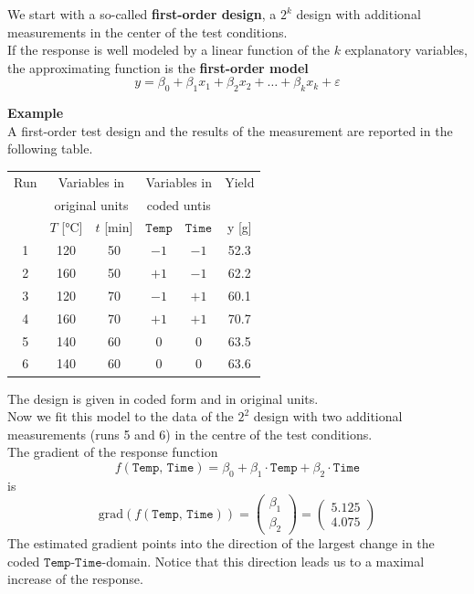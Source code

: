 We start with a so-called \textbf{first-order design}, a $2^k$ design with additional measurements in the center of the test conditions.\\
If the response is well modeled by a linear function of the $k$ explanatory variables, the approximating function is the \textbf{first-order model}
\begin{equation}
  y = \beta_0 + \beta_1 x_1 + \beta_2 x_2 + \dots + \beta_k x_k + \varepsilon
\end{equation}

\textbf{Example}\\
A first-order test design and the results of the measurement are reported in the following table.
\begin{table}[H]
  \centering
  \scriptsize
    \begin{tabular}{c|cc|cc|c}
      Run & \multicolumn{2}{c}{Variables in}   & \multicolumn{2}{c}{Variables in} & Yield \\
          & \multicolumn{2}{c}{original units} & \multicolumn{2}{c}{coded untis}  &       \\
          & $T$ [°C] & $t$ [min]               & $\texttt{Temp}$ & $\texttt{Time}$ & y [g]\\ \hline
      1 & 120 & 50 & $-1$ & $-1$ & 52.3 \\
      2 & 160 & 50 & $+1$ & $-1$ & 62.2 \\
      3 & 120 & 70 & $-1$ & $+1$ & 60.1 \\
      4 & 160 & 70 & $+1$ & $+1$ & 70.7 \\ \hline
      5 & 140 & 60 &   0  &   0  & 63.5 \\
      6 & 140 & 60 &   0  &   0  & 63.6
    \end{tabular}
\end{table}
The design is given in coded form and in original units.\\
Now we fit this model to the data of the $2^2$ design with two additional measurements (runs 5 and 6) in the centre of the test conditions.\\
The gradient of the response function
\begin{equation}
  f(\texttt{Temp, Time}) = \beta_0 + \beta_1 \cdot \texttt{Temp} + \beta_2 \cdot \texttt{Time}
\end{equation}
is
\begin{equation}
  \text{grad}\left(f(\texttt{Temp, Time})\right) =
  \begin{pmatrix} \beta_1 \\ \beta_2 \end{pmatrix} =
  \begin{pmatrix} 5.125 \\ 4.075 \end{pmatrix}
\end{equation}
The estimated gradient points into the direction of the largest change in the coded $\texttt{Temp-Time}$-domain. Notice that this direction leads us to a maximal increase of the response.

